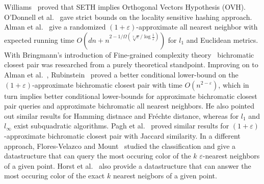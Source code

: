 \documentclass[a4paper,UKenglish,cleveref, autoref, thm-restate]{lipics-v2021}
\begin{document}
Williams~\cite{Williams2005} proved that SETH implies Orthogonal Vectors Hypothesis (OVH).
O'Donnell et al.~\cite{ODonnell2009} gave strict bounds on the locality sensitive hashing approach.
Alman et al.~\cite{Alman2016} give a randomized $(1+\varepsilon)$-approximate all nearest neighbor with expected running time $O(dn + n^{2 - 1/\Omega(\sqrt[3]{\varepsilon}/\log \frac{1}{\varepsilon})})$ for $l_1$ and Euclidean metrics.
With Bringmann's introduction of Fine-grained complexity theory~\cite{Bringmann2019,Bringmann2021} bichromatic closest pair was researched from a purely theoretical standpoint.
Improving on to Alman et al.~\cite{Alman2016}, Rubinstein~\cite{Rubinstein2018} proved a better conditional lower-bound on the $(1+\varepsilon)$-approximate bichromatic closest pair with time $O(n^{2-\varepsilon})$, which in turn implies better conditional lower-bounds for approximate bichromatic closest pair queries and approximate bichromatic all nearest neighbors.
He also pointed out similar results for Hamming distnace and Fr\'{e}chte distance, whereas for $l_1$ and $l_\infty$ exist subquadratic algorithms.
Pagh et al.~\cite{Pagh2019} proved similar results for $(1+\varepsilon)$-approximate bichromatic closest pair with Jaccard similarity.
In a different approach, Flores-Velazco and Mount~\cite{FloresVelazco2021} studied the classification and give a datastructure that can query the most occuring color of the $k$ $\varepsilon$-nearest neighbors of a given point.
Horst et al.~\cite{Horst2022} also provide a datastructure that can answer the most occuring color of the exact $k$ nearest neigbors of a given point.
\end{document}

